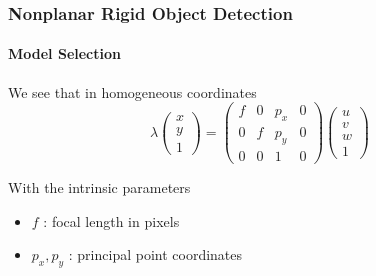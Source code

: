 \documentclass[xetex,professionalfont]{beamer}
\renewcommand\emph[1]{\textcolor{tuwcvl_inf_red}{#1}}
\begin{document}

\begin{frame}
\frametitle{Nonplanar Rigid Object Detection}
\framesubtitle{Model Selection}


We see that in homogeneous coordinates %
\[
\lambda
\begin{pmatrix}
    x \\ y \\ 1
\end{pmatrix} =
\begin{pmatrix}
    f & 0 & p_x & 0 \\ 0 & f & p_y & 0 \\ 0 & 0 & 1 & 0
\end{pmatrix}
\begin{pmatrix}
    u \\ v \\ w \\ 1
\end{pmatrix}
\]

With the \emph{intrinsic parameters} %
\begin{itemize}
    \item $f$ : focal length in pixels
    \item $p_x,p_y$ : principal point coordinates
\end{itemize}

\end{frame}

\end{document}
